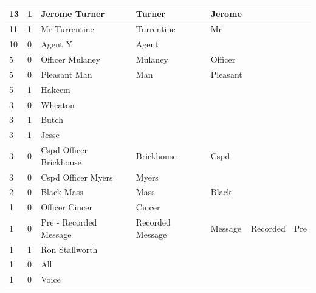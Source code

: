 \documentclass[a4paper, 12pt]{report}
\begin{document}
\begin{table}[]
{\begin{tabular}{|l|l|l|l|l|l|l|}
13               & 1        & Jerome Turner              & Turner           & Jerome    &          &            \\ \hline
11               & 1        & Mr Turrentine              & Turrentine       & Mr        &          &            \\ \hline
10               & 0        & Agent Y                    & Agent            &           &          &            \\ \hline
5                & 0        & Officer Mulaney            & Mulaney          & Officer   &          &            \\ \hline
5                & 0        & Pleasant Man               & Man              & Pleasant  &          &            \\ \hline
5                & 1        & Hakeem                     &                  &           &          &            \\ \hline
3                & 0        & Wheaton                    &                  &           &          &            \\ \hline
3                & 1        & Butch                      &                  &           &          &            \\ \hline
3                & 1        & Jesse                      &                  &           &          &            \\ \hline
3                & 0        & Cspd Officer Brickhouse    & Brickhouse       & Cspd      &          &            \\ \hline
3                & 0        & Cspd Officer Myers         & Myers            &           &          &            \\ \hline
2                & 0        & Black Mass                 & Mass             & Black     &          &            \\ \hline
1                & 0        & Officer Cincer             & Cincer           &           &          &            \\ \hline
1                & 0        & Pre - Recorded Message     & Recorded Message & Message   & Recorded & Pre        \\ \hline
1                & 1        & Ron Stallworth             &                  &           &          &            \\ \hline
1                & 0        & All                        &                  &           &          &            \\ \hline
1                & 0        & Voice                      &                  &           &          &            \\ \hline

\end{tabular}}
\end{table}
\end{document}
